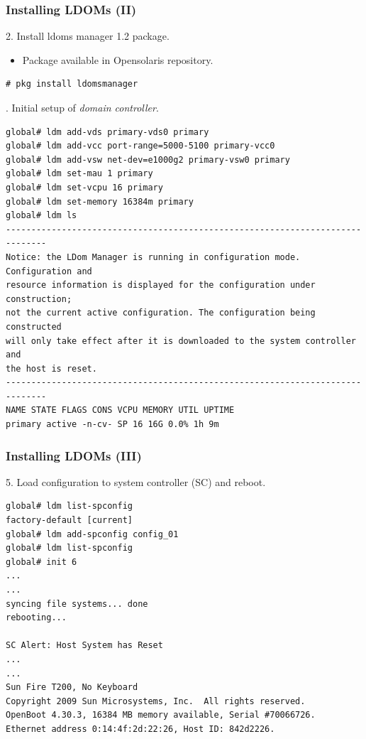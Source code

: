 \documentclass{beamer}
\begin{document}
\begin{frame}[fragile]
\frametitle{Installing LDOMs (II)}

2. Install ldoms manager 1.2 package.\pause
\begin{itemize}
\item Package available in Opensolaris repository.
\end{itemize}
\pause
{\tiny
\begin{verbatim}
# pkg install ldomsmanager
\end{verbatim}
}
. Initial setup of {\em domain controller}.
\pause
{\tiny
\begin{verbatim}
global# ldm add-vds primary-vds0 primary
global# ldm add-vcc port-range=5000-5100 primary-vcc0 
global# ldm add-vsw net-dev=e1000g2 primary-vsw0 primary
global# ldm set-mau 1 primary
global# ldm set-vcpu 16 primary
global# ldm set-memory 16384m primary
global# ldm ls
------------------------------------------------------------------------------ 
Notice: the LDom Manager is running in configuration mode. Configuration and
resource information is displayed for the configuration under construction;
not the current active configuration. The configuration being constructed
will only take effect after it is downloaded to the system controller and
the host is reset.
------------------------------------------------------------------------------
NAME STATE FLAGS CONS VCPU MEMORY UTIL UPTIME
primary active -n-cv- SP 16 16G 0.0% 1h 9m
\end{verbatim}
}

\end{frame}

\begin{frame}[fragile]
\frametitle{Installing LDOMs (III)}

5. Load configuration to system controller (SC) and reboot.
\pause
{\tiny
\begin{verbatim}
global# ldm list-spconfig
factory-default [current]
global# ldm add-spconfig config_01
global# ldm list-spconfig
global# init 6
...
...
syncing file systems... done
rebooting...

SC Alert: Host System has Reset
...
...
Sun Fire T200, No Keyboard
Copyright 2009 Sun Microsystems, Inc.  All rights reserved.
OpenBoot 4.30.3, 16384 MB memory available, Serial #70066726.
Ethernet address 0:14:4f:2d:22:26, Host ID: 842d2226.
\end{verbatim}
}

\end{frame}
\end{document}
